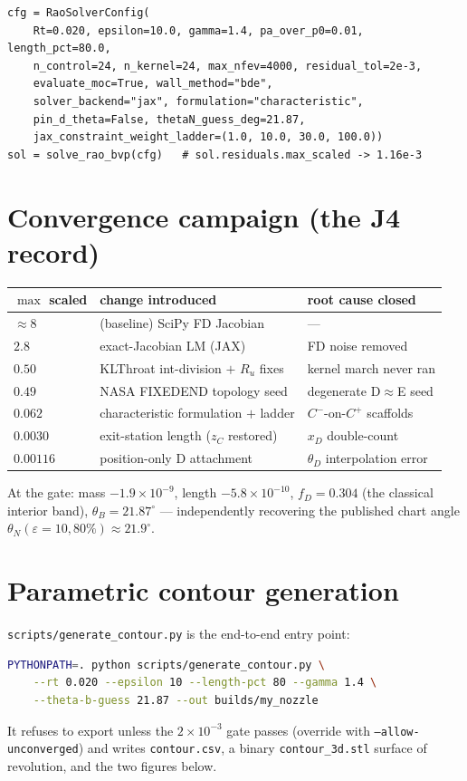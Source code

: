 \documentclass[11pt]{article}
\begin{document}
\begin{lstlisting}
cfg = RaoSolverConfig(
    Rt=0.020, epsilon=10.0, gamma=1.4, pa_over_p0=0.01, length_pct=80.0,
    n_control=24, n_kernel=24, max_nfev=4000, residual_tol=2e-3,
    evaluate_moc=True, wall_method="bde",
    solver_backend="jax", formulation="characteristic",
    pin_d_theta=False, thetaN_guess_deg=21.87,
    jax_constraint_weight_ladder=(1.0, 10.0, 30.0, 100.0))
sol = solve_rao_bvp(cfg)   # sol.residuals.max_scaled -> 1.16e-3
\end{lstlisting}

\section{Convergence campaign (the J4 record)}
\begin{center}
\begin{tabular}{lll}
\toprule
$\max$ scaled & change introduced & root cause closed \\
\midrule
$\approx 8$ & (baseline) SciPy FD Jacobian & --- \\
$2.8$ & exact-Jacobian LM (JAX) & FD noise removed \\
$0.50$ & KLThroat int-division $+$ $R_u$ fixes & kernel march never ran \\
$0.49$ & NASA FIXEDEND topology seed & degenerate D$\approx$E seed \\
$0.062$ & characteristic formulation $+$ ladder & $C^-$-on-$C^+$ scaffolds \\
$0.0030$ & exit-station length ($z_C$ restored) & $x_D$ double-count \\
$\mathbf{0.00116}$ & position-only D attachment & $\theta_D$ interpolation error \\
\bottomrule
\end{tabular}
\end{center}
At the gate: mass $-1.9\times10^{-9}$, length $-5.8\times10^{-10}$,
$f_D=0.304$ (the classical interior band), $\theta_B = 21.87^\circ$
--- independently recovering the published chart angle
$\theta_N(\varepsilon{=}10, 80\%)\approx21.9^\circ$.

\section{Parametric contour generation}
\label{sec:generator}
\texttt{scripts/generate\_contour.py} is the end-to-end entry point:
\begin{lstlisting}[language=bash]
PYTHONPATH=. python scripts/generate_contour.py \
    --rt 0.020 --epsilon 10 --length-pct 80 --gamma 1.4 \
    --theta-b-guess 21.87 --out builds/my_nozzle
\end{lstlisting}
It refuses to export unless the $2\times10^{-3}$ gate passes (override
with \texttt{--allow-unconverged}) and writes \texttt{contour.csv},
a binary \texttt{contour\_3d.stl} surface of revolution, and the two
figures below.
\end{document}
